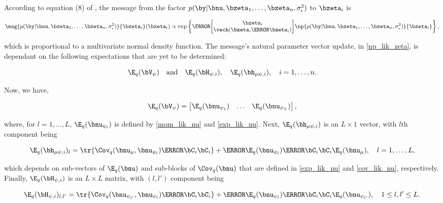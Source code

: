 \documentclass[12pt]{article}
\def\sigsqeps{\sigma^2_{\epsilon}}
\def\numu{\bnu_\mu}
\def\Vpsi{\bV_\psi}
\newcommand\nupsi[1]{\bnu_{\psi_{#1}}}
\newcommand\hmupsi[1]{\bh_{\mu \psi, i}}
\newcommand\Hpsi[1]{\bH_{\psi, i}}
\theoremstyle{plain}
\theoremstyle{definition}
\theoremstyle{remark}
\begin{document}
\noindent According to equation (8) of , the message from the factor
$p (\by | \bnu, \bzeta_1, \dots, \bzeta_n, \sigsqeps)$ to $\bzeta_i$ is 

\[
	\msg{p (\by | \bnu, \bzeta_1, \dots, \bzeta_n, \sigsqeps)}{\bzeta_i} (\bzeta_i) \propto
		\exp \left\{
			\T{\begin{bmatrix}
				\bzeta_i \\
				\vech (\bzeta_i \T{\bzeta_i})
			\end{bmatrix}}
			\np{p (\by | \bnu, \bzeta_1, \dots, \bzeta_n, \sigsqeps)}{\bzeta_i}
		\right\},
\]

\noindent which
is proportional to a multivariate normal density function. The message's natural parameter vector update, in
\eqref{np_lik_zeta}, is dependant on the following expectations that are yet to be determined:

\[
	\E_q (\Vpsi) \quad \text{and} \quad \E_q (\Hpsi{i}), \quad \E_q (\hmupsi{i}), \quad i = 1, \dots, n.
\]

\noindent Now, we have,

\begin{equation}
	\E_q (\Vpsi) = \begin{bmatrix}
		\E_q (\nupsi{1}) & \dots & \E_q (\nupsi{L})
	\end{bmatrix},
\label{E_q_Vpsi}
\end{equation}

\noindent where, for $l = 1, \dots, L$, $\E_q (\nupsi{l})$ is defined by \eqref{mom_lik_nu} and \eqref{exp_lik_nu}.
Next, $\E_q (\hmupsi{i})$ is an $L \times 1$ vector, with $l$th component being

\begin{equation}
	\E_q (\hmupsi{i})_l =
		\tr \{ \Cov_q (\numu, \nupsi{l}) \T{\bC_i} \bC_i \}
		+ \T{\E_q (\nupsi{l})} \T{\bC_i} \bC_i \E_q (\numu), \quad
	l = 1, \dots, L,
\label{exp_lik_hmupsi}
\end{equation}

\noindent which depends on sub-vectors of $\E_q (\bnu)$ and sub-blocks of $\Cov_q (\bnu)$ that are defined
in \eqref{exp_lik_nu} and \eqref{cov_lik_nu}, respectively. Finally, $\E_q (\Hpsi{i})$ is an $L \times L$ matrix,
with $(l, l')$ component being

\begin{equation}
	\E_q (\Hpsi{i})_{l, l'} =
		\tr \{ \Cov_q (\nupsi{l'}, \nupsi{l}) \T{\bC_i} \bC_i \}
		+ \T{\E_q (\nupsi{l})} \T{\bC_i} \bC_i \E_q (\nupsi{l'}), \quad
	1 \le l, l' \le L.
\label{exp_lik_Hpsi}
\end{equation}
\end{document}
